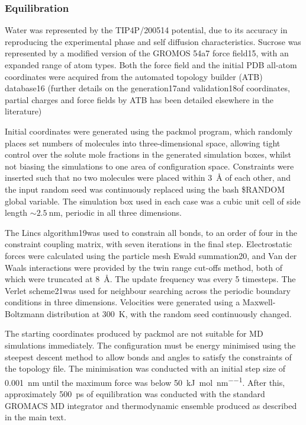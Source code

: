\subsubsection{Equilibration}
Water was represented by the TIP4P/200514 potential, due to its accuracy in reproducing the experimental phase and self diffusion characteristics. Sucrose was represented by a modified version of the GROMOS 54a7 force field15, with an expanded range of atom types. Both the force field and the initial PDB all-atom coordinates were acquired from the automated topology builder (ATB) database16 (further details on the generation17and validation18of coordinates, partial charges and force fields by ATB has been detailed elsewhere in the literature)

Initial coordinates were generated using the packmol program, which randomly places set numbers of molecules into three-dimensional space, allowing tight control over the solute mole fractions in the generated simulation boxes, whilst not biasing the simulations to one area of configuration space. Constraints were inserted such that no two molecules were placed within \SI{3}{\angstrom} of each other, and the input random seed was continuously replaced using the bash \$RANDOM global variable. The simulation box used in each case was a cubic unit cell of side length $\sim \SI{2.5}{\nano\meter}$, periodic in all three dimensions.

The Lincs algorithm19was used to constrain all bonds, to an order of four in the constraint coupling matrix, with seven iterations in the final step. Electrostatic forces were calculated using the particle mesh Ewald summation20, and Van der Waals interactions were provided by the twin range cut-offs method, both of which were truncated at \SI{8}{\angstrom}. The update frequency was every 5 timesteps. The Verlet scheme21was used for neighbour searching across the periodic boundary conditions in three dimensions. Velocities were generated using a Maxwell-Boltzmann distribution at \SI{300}{\kelvin}, with the random seed continuously changed. 

The starting coordinates produced by packmol are not suitable for MD simulations immediately. The configuration must be energy minimised using the steepest descent method to allow bonds and angles to satisfy the constraints of the topology file. The minimisation was conducted with an initial step size of \SI{0.001}{\nano\meter} until the maximum force was below \SI{50}{\kilo\joule\per\mole\per\nano\meter}. After this, approximately \SI{500}{\pico\second} of equilibration was conducted with the standard GROMACS MD integrator and thermodynamic ensemble produced as described in the main text. 

